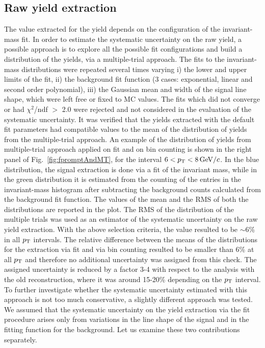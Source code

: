 \subsection{Raw yield extraction}
\label{sec:RawYieldSyst}
The value extracted for the yield depends on the  
configuration of the invariant-mass fit.
In order to estimate the systematic uncertainty on the raw yield,
a possible approach is to explore all the possible fit configurations and build
a distribution of the yields, via a multiple-trial approach. The fits to the invariant-mass 
distributions were repeated several times varying
i) the lower and upper limits of the fit, 
ii) the background fit function (3 cases: exponential, linear and second 
order polynomial), iii) the Gaussian mean and width of the signal line shape, 
which were left free or fixed to MC
values. The fits which did not converge or had $\chi^2$/ndf $>$ 2.0 
were rejected and not considered in the evaluation of the 
systematic uncertainty. It was verified that the yields extracted with the
default fit parameters had compatible values to the mean of
the distribution of yields from the multiple-trial approach. 
An example of the distribution of yields from multiple-trial approach applied on fit and on
bin counting is shown in the right panel of Fig.~\ref{fig:fpromptAndMT},
for the interval $6 < p_{\rm T} < 8 \, \mathrm{GeV}/c$. 
In the blue distribution, the signal extraction is done via a fit of the invariant mass, while
in the green distribution it is estimated from the counting of the entries in the invariant-mass histogram after 
subtracting the background counts calculated from the 
background fit function.
The values of the mean and the RMS
of both the distributions are reported in the plot.
The RMS of the distribution of the multiple trials was used as an estimator of
the systematic uncertainty on the raw yield extraction. With the above
selection criteria, the value resulted to be $\sim$6\% in all $p_{\rm T}$ intervals.
The relative difference between the means of the distributions
for the extraction via fit and via bin counting resulted
to be smaller than 6\% at all $p_{\rm T}$ and therefore no additional uncertainty was assigned from this check. 
The assigned uncertainty is reduced by a factor 3-4 with respect to the analysis with the old reconstruction,
where it was around 15-20\% depending on the $p_{\rm T}$ interval. 
To further investigate whether the systematic uncertainty estimated with
this approach is not too much conservative, a slightly
different approach was tested. We assumed that 
the systematic uncertainty on the yield extraction via the fit procedure 
arises only from variations in the line shape of the signal and 
in the fitting function for the 
background. Let us examine these two contributions separately.\\

